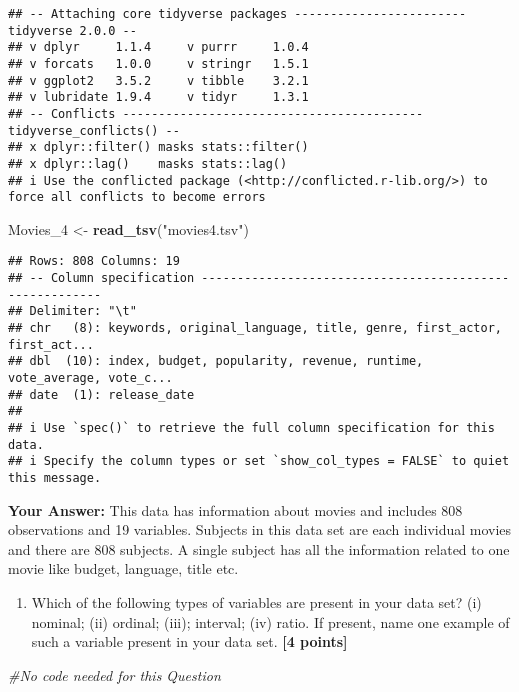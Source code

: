 \documentclass[
]{article}
\newenvironment{Shaded}{\begin{snugshade}}{\end{snugshade}}
\newcommand{\CommentTok}[1]{\textcolor[rgb]{0.56,0.35,0.01}{\textit{#1}}}
\newcommand{\FunctionTok}[1]{\textcolor[rgb]{0.13,0.29,0.53}{\textbf{#1}}}
\newcommand{\NormalTok}[1]{#1}
\newcommand{\OtherTok}[1]{\textcolor[rgb]{0.56,0.35,0.01}{#1}}
\newcommand{\StringTok}[1]{\textcolor[rgb]{0.31,0.60,0.02}{#1}}
\providecommand{\tightlist}{%
  \setlength{\itemsep}{0pt}\setlength{\parskip}{0pt}}
\begin{document}
\begin{verbatim}
## -- Attaching core tidyverse packages ------------------------ tidyverse 2.0.0 --
## v dplyr     1.1.4     v purrr     1.0.4
## v forcats   1.0.0     v stringr   1.5.1
## v ggplot2   3.5.2     v tibble    3.2.1
## v lubridate 1.9.4     v tidyr     1.3.1
## -- Conflicts ------------------------------------------ tidyverse_conflicts() --
## x dplyr::filter() masks stats::filter()
## x dplyr::lag()    masks stats::lag()
## i Use the conflicted package (<http://conflicted.r-lib.org/>) to force all conflicts to become errors
\end{verbatim}

\begin{Shaded}
\begin{Highlighting}[]
\NormalTok{Movies\_4 }\OtherTok{\textless{}{-}} \FunctionTok{read\_tsv}\NormalTok{(}\StringTok{"movies4.tsv"}\NormalTok{)}
\end{Highlighting}
\end{Shaded}

\begin{verbatim}
## Rows: 808 Columns: 19
## -- Column specification --------------------------------------------------------
## Delimiter: "\t"
## chr   (8): keywords, original_language, title, genre, first_actor, first_act...
## dbl  (10): index, budget, popularity, revenue, runtime, vote_average, vote_c...
## date  (1): release_date
## 
## i Use `spec()` to retrieve the full column specification for this data.
## i Specify the column types or set `show_col_types = FALSE` to quiet this message.
\end{verbatim}

\textbf{Your Answer:} This data has information about movies and
includes 808 observations and 19 variables. Subjects in this data set
are each individual movies and there are 808 subjects. A single subject
has all the information related to one movie like budget, language,
title etc.

\begin{enumerate}
\def\labelenumi{\arabic{enumi}.}
\setcounter{enumi}{1}
\tightlist
\item
  Which of the following types of variables are present in your data
  set? (i) nominal; (ii) ordinal; (iii); interval; (iv) ratio. If
  present, name one example of such a variable present in your data set.
  \textbf{[4 points]}
\end{enumerate}

\begin{Shaded}
\begin{Highlighting}[]
\CommentTok{\#No code needed for this Question}
\end{Highlighting}
\end{Shaded}
\end{document}
